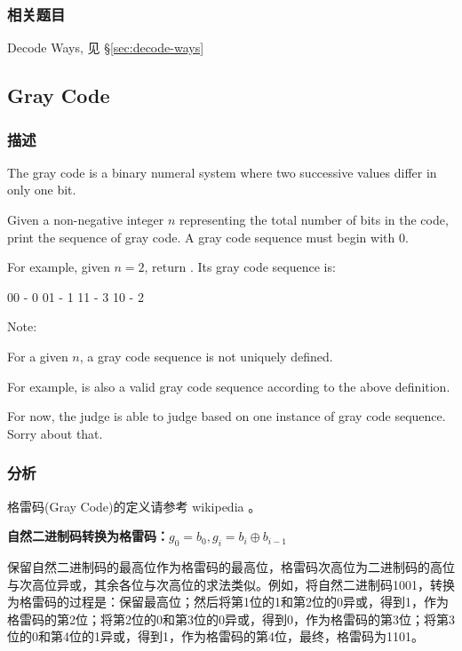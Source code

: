 \subsubsection{相关题目}
\begindot
\item Decode Ways, 见 \S \ref{sec:decode-ways}
\myenddot


\subsection{Gray Code} %
\label{sec:gray-code}


\subsubsection{描述}
The gray code is a binary numeral system where two successive values differ in only one bit.

Given a non-negative integer $n$ representing the total number of bits in the code, print the sequence of gray code. A gray code sequence must begin with 0.

For example, given $n = 2$, return \fn{[0,1,3,2]}. Its gray code sequence is:
\begin{Code}
00 - 0
01 - 1
11 - 3
10 - 2
\end{Code}

Note:
\begindot
\item For a given $n$, a gray code sequence is not uniquely defined.
\item For example, \fn{[0,2,3,1]} is also a valid gray code sequence according to the above definition.
\item For now, the judge is able to judge based on one instance of gray code sequence. Sorry about that.
\myenddot


\subsubsection{分析}
格雷码(Gray Code)的定义请参考 wikipedia 。

\textbf{自然二进制码转换为格雷码：$g_0=b_0, g_i=b_i \oplus b_{i-1}$}

保留自然二进制码的最高位作为格雷码的最高位，格雷码次高位为二进制码的高位与次高位异或，其余各位与次高位的求法类似。例如，将自然二进制码1001，转换为格雷码的过程是：保留最高位；然后将第1位的1和第2位的0异或，得到1，作为格雷码的第2位；将第2位的0和第3位的0异或，得到0，作为格雷码的第3位；将第3位的0和第4位的1异或，得到1，作为格雷码的第4位，最终，格雷码为1101。

